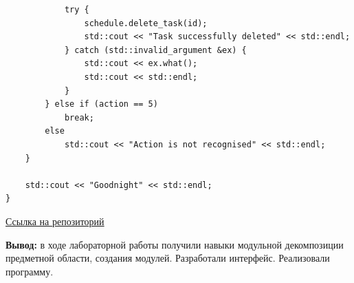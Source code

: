 \documentclass[a4paper,14pt]{extarticle}
\begin{document}
\begin{verbatim}
            try {
                schedule.delete_task(id);
                std::cout << "Task successfully deleted" << std::endl;
            } catch (std::invalid_argument &ex) {
                std::cout << ex.what();
                std::cout << std::endl;
            }
        } else if (action == 5)
            break;
        else
            std::cout << "Action is not recognised" << std::endl;
    }

    std::cout << "Goodnight" << std::endl;
}
\end{verbatim}

\href{https://github.com/IAmProgrammist/oop/tree/master}{Ссылка на репозиторий}

\textbf{Вывод: } в ходе лабораторной работы получили навыки модульной декомпозиции
предметной области, создания модулей. Разработали интерфейс. Реализовали программу.
\end{document}
